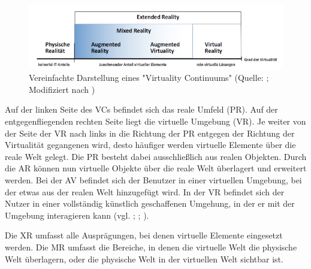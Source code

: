 \begin{figure}[ht]
\centering
\includegraphics[width=1\linewidth]{content/pictures/virtuality-continuum_upscaled.PNG}
\caption{Vereinfachte Darstellung eines "Virtuality Continuums" (Quelle: \citealp[S. 9]{knoll_augmented_2022}; Modifiziert nach \citealp[S. 3]{milgram_taxonomy_1994})}
\label{fig:virtuality-continuum}
\end{figure}

Auf der linken Seite des \ac{VC}s befindet sich das reale Umfeld (\ac{PR}). Auf der entgegenfliegenden rechten Seite liegt die virtuelle Umgebung (\ac{VR}). Je weiter von der Seite der \ac{VR} nach links in die Richtung der \ac{PR} entgegen der Richtung der Virtualität gegangenen wird, desto häufiger werden virtuelle Elemente über die reale Welt gelegt. Die \ac{PR} besteht dabei ausschließlich aus realen Objekten. Durch die \ac{AR} können nun virtuelle Objekte über die reale Welt überlagert und erweitert werden. Bei der \ac{AV} befindet sich der Benutzer in einer virtuellen Umgebung, bei der etwas aus der realen Welt hinzugefügt wird. In der \ac{VR} befindet sich der Nutzer in einer vollständig künstlich geschaffenen Umgehung, in der er mit der Umgebung interagieren kann (vgl. \citealp[S. 3]{milgram_taxonomy_1994}; \citealp[S. 8f]{knoll_augmented_2022}; \citealp[S. 3]{zuniga_gonzalez_making_2021}). 

Die \ac{XR} umfasst alle Ausprägungen, bei denen virtuelle Elemente eingesetzt werden. Die \ac{MR} umfasst die Bereiche, in denen die virtuelle Welt die physische Welt überlagern, oder die physische Welt in der virtuellen Welt sichtbar ist. 

